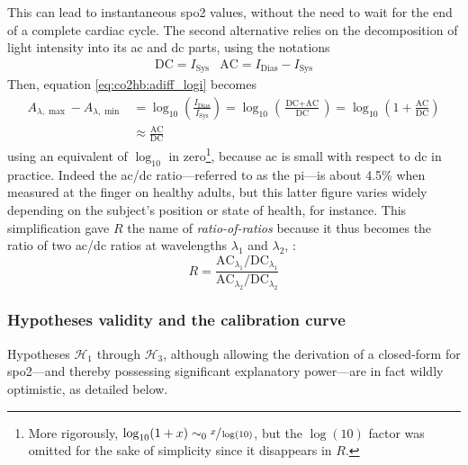 This can lead to instantaneous \gls{spo2} values, without the need to wait for the end of a complete cardiac cycle\cite{vazquezjaccaud2011}. The second alternative relies on the decomposition of light intensity into its \gls{ac} and \gls{dc} parts, \ie{} using the notations
\begin{eqnarray}
	\text{DC} = I_{\text{Sys}} & \text{AC} = I_{\text{Dias}} - I_{\text{Sys}}
\end{eqnarray}
Then, equation \ref{eq:co2hb:adiff_logi} becomes
\begin{equation}
	\begin{aligned}
		A_{\lambda,\max} - A_{\lambda,\min} &= \log_{10}\left(\frac{I_\text{Dias}}{I_\text{Sys}}\right) = \log_{10} \left( \frac{\text{DC} + \text{AC}}{\text{DC}} \right) = \log_{10} \left(1 + \frac{\text{AC}}{\text{DC}}\right)\\
		&\approx \frac{\text{AC}}{\text{DC}}
	\end{aligned}
\end{equation}
using an equivalent of $\log_{10}$ in zero\footnote{More rigorously, $\log_{10}(1+x)\sim_0 \sfrac{x}{\log(10)}$, but the $\log(10)$ factor was omitted for the sake of simplicity since it disappears in $R$.}, because \gls{ac} is small with respect to \gls{dc} in practice. Indeed the \gls{ac}/\gls{dc} ratio---referred to as the \gls{pi}---is about 4.5\% when measured at the finger on healthy adults\cite{tapar2018, fodor2022}, but this latter figure varies widely depending on the subject's position\cite{rathgeber1996, tapar2018} or state of health\cite{sivaprasath2019}, for instance. This simplification gave $R$ the name of \emph{ratio-of-ratios}\cite{nitzan2014} because it thus becomes the ratio of two \gls{ac}/\gls{dc} ratios at wavelengths $\lambda_1$ and $\lambda_2$, \ie{}:
\begin{equation}
	R = \frac{\text{AC}_{\lambda_1} / \text{DC}_{\lambda_1}}{\text{AC}_{\lambda_2} /\text{DC}_{\lambda_2}}
\end{equation}

\subsubsection{Hypotheses validity and the calibration curve}

Hypotheses $\mathcal{H}_1$ through $\mathcal{H}_3$, although allowing the derivation of a closed-form for \gls{spo2}---and thereby possessing significant explanatory power---are in fact wildly optimistic, as detailed below.

